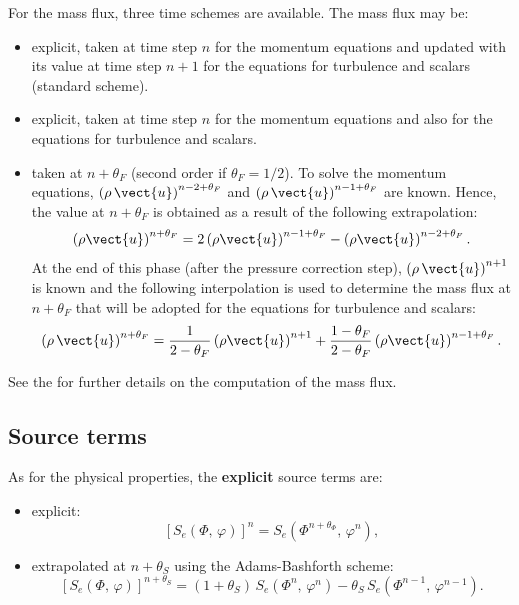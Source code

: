 For the mass flux, three time schemes are available. The mass flux may be:
%
\begin{itemize}
\item explicit, taken at time step $n$ for the momentum equations and
updated with its value at time step $n+1$ for the equations for turbulence
and scalars (standard scheme).

\item explicit, taken at time step $n$ for the momentum equations and
also for the equations for turbulence and scalars.

\item taken at $n+\theta_{F}$ (second order if $\theta_{F}=1/2$). To
solve the momentum equations, $\left(\rho\,\vect{u}\right)^{n-2+\theta_{F}}$ and
$\left(\rho\,\vect{u}\right)^{n-1+\theta_{F}}$ are known. Hence, the value at
$n+\theta_{F}$ is obtained as a result of the following extrapolation:
\begin{equation}
\left(\rho\vect{u}\right)^{n+\theta_{F}}
= 2 \left(\rho \vect{u}\right)^{n-1+\theta_{F}}
- \left(\rho \vect{u}\right)^{n-2+\theta_{F}}.
\end{equation}
At the end of this phase (after the pressure correction step),
$\left(\rho\,\vect{u}\right)^{n+1}$ is known and the following interpolation is used to
determine the mass flux at $n+\theta_{F}$ that will be adopted for the
equations for turbulence and scalars:
\begin{equation}
\left(\rho\,\vect{u}\right)^{n+\theta_{F}}= \dfrac{1}{2-\theta_{F}}
   \left(\rho \vect{u}\right)^{n+1}
+\frac{1-\theta_{F}}{2-\theta_{F}} \left(\rho \vect{u}\right)^{n-1+\theta_{F}}.
\end{equation}
\end{itemize}

See the  for further details
on the computation of the mass flux.

\subsection{Source terms}

As for the physical properties, the \textbf{explicit} source terms are:

\begin{itemize}
\item explicit:
\begin{equation}
\left[ S_{e} \left(\Phi , \, \varphi \right) \right]^{n}=S_{e}\left(\Phi ^{n+\theta_{\Phi }}, \, \varphi^{n} \right),
\end{equation}

\item extrapolated at $n+\theta _{S}$ using the Adams-Bashforth scheme:
\begin{equation}
\left[ S_{e} \left(\Phi , \, \varphi \right) \right]^{n+\theta _{S}}=\left(1+\theta _{S}\right)\,
S_{e}\left(\Phi^{n}, \, \varphi^{n}\right)-\theta _{S}\,S_{e} \left(\Phi ^{n-1} , \,\varphi ^{n-1}\right) .
\end{equation}
\end{itemize}

